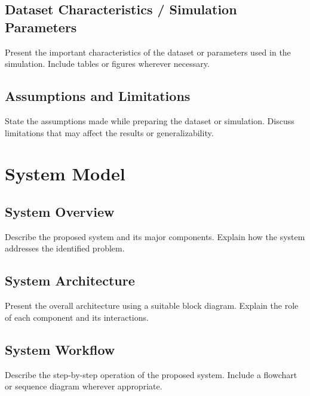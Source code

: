 \documentclass[12pt,a4paper]{report}
\begin{document}
\section{Dataset Characteristics / Simulation Parameters}
Present the important characteristics of the dataset or parameters
used in the simulation. Include tables or figures wherever necessary.

\section{Assumptions and Limitations}
State the assumptions made while preparing the dataset or simulation.
Discuss limitations that may affect the results or generalizability.


\chapter{System Model}

\section{System Overview}
Describe the proposed system and its major components.
Explain how the system addresses the identified problem.

\section{System Architecture}
Present the overall architecture using a suitable block diagram.
Explain the role of each component and its interactions.

\section{System Workflow}
Describe the step-by-step operation of the proposed system.
Include a flowchart or sequence diagram wherever appropriate.
\end{document}
